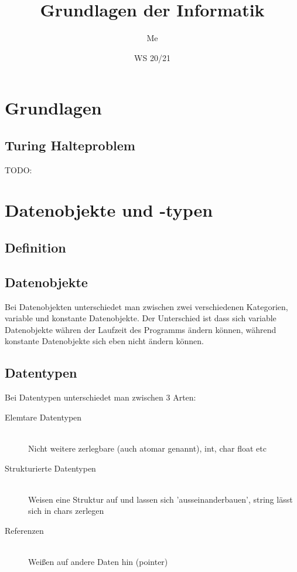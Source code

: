 \documentclass[a4paper]{scrartcl}
\author{Me}
\title{Grundlagen der Informatik}
\date{WS 20/21}
\begin{document}
    \maketitle
    \newpage
    \tableofcontents
    \newpage
    \section{Grundlagen}
        \subsection{Turing Halteproblem}
            TODO: 
    \section{Datenobjekte und -typen}
        \subsection{Definition}
        \subsection*{Datenobjekte}
            Bei Datenobjekten unterschiedet man zwischen zwei verschiedenen Kategorien, variable und konstante Datenobjekte. Der Unterschied ist dass sich variable Datenobjekte währen der Laufzeit
            des Programms ändern können, während konstante Datenobjekte sich eben nicht ändern können.
        \subsection*{Datentypen}
            Bei Datentypen unterschiedet man zwischen 3 Arten: 
            \begin{description}
                \item[Elemtare Datentypen] \hfill \\
                    Nicht weitere zerlegbare (auch atomar genannt), int, char float etc
                \item[Strukturierte Datentypen] \hfill \\
                    Weisen eine Struktur auf und lassen sich 'ausseinanderbauen', string lässt sich in chars zerlegen
                \item[Referenzen] \hfill \\
                    Weißen auf andere Daten hin (pointer)  
            \end{description}
        
\end{document}
